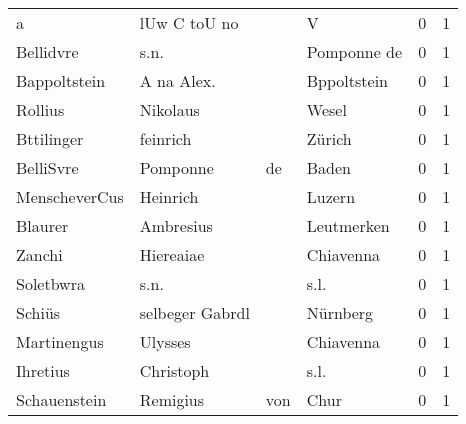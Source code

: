 \documentclass[10pt,a4paper,landscape]{article}
\begin{document}
\begin{longtable}{llllrr}
                        a &                       lUw C toU no &             &                                           V &          0 &         1 \\
                Bellidvre &                               s.n. &             &                                 Pomponne de &          0 &         1 \\
             Bappoltstein &                         A na Alex. &             &                                 Bppoltstein &          0 &         1 \\
                  Rollius &                           Nikolaus &             &                                       Wesel &          0 &         1 \\
               Bttilinger &                           feinrich &             &                                      Zürich &          0 &         1 \\
                BelliSvre &                           Pomponne &          de &                                       Baden &          0 &         1 \\
            MenscheverCus &                           Heinrich &             &                                      Luzern &          0 &         1 \\
                  Blaurer &                          Ambresius &             &                                  Leutmerken &          0 &         1 \\
                   Zanchi &                          Hiereaiae &             &                                   Chiavenna &          0 &         1 \\
                Soletbwra &                               s.n. &             &                                        s.l. &          0 &         1 \\
                   Schiüs &                    selbeger Gabrdl &             &                                    Nürnberg &          0 &         1 \\
              Martinengus &                            Ulysses &             &                                   Chiavenna &          0 &         1 \\
                 Ihretius &                          Christoph &             &                                        s.l. &          0 &         1 \\
             Schauenstein &                           Remigius &         von &                                        Chur &          0 &         1 \\

\end{longtable}
\end{document}
